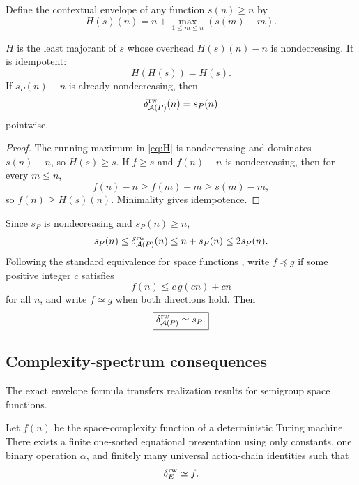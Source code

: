 Define the contextual envelope of any function $s(n)\ge n$ by
\begin{equation}
H(s)(n)=n+\max_{1\le m\le n}(s(m)-m).
\label{eq:H}
\end{equation}

\begin{proposition}\label{prop:H}
$H$ is the least majorant of $s$ whose overhead $H(s)(n)-n$ is nondecreasing.  It is idempotent:
\[
H(H(s))=H(s).
\]
If $s_P(n)-n$ is already nondecreasing, then
\[
\delta^{\mathrm{rw}}_{\mathcal A(P)}(n)=s_P(n)
\]
pointwise.
\end{proposition}

\begin{proof}
The running maximum in \eqref{eq:H} is nondecreasing and dominates $s(n)-n$, so $H(s)\ge s$.  If $f\ge s$ and $f(n)-n$ is nondecreasing, then for every $m\le n$,
\[
f(n)-n\ge f(m)-m\ge s(m)-m,
\]
so $f(n)\ge H(s)(n)$.  Minimality gives idempotence.
\end{proof}

Since $s_P$ is nondecreasing and $s_P(n)\ge n$,
\begin{equation}
s_P(n)\le\delta^{\mathrm{rw}}_{\mathcal A(P)}(n)
\le n+s_P(n)\le2s_P(n).
\label{eq:spacebounds}
\end{equation}
Following the standard equivalence for space functions \cite{Olshanskii2013}, write $f\preceq g$ if some positive integer $c$ satisfies
\[
f(n)\le c\,g(cn)+cn
\]
for all $n$, and write $f\simeq g$ when both directions hold.  Then
\begin{equation}
\boxed{\delta^{\mathrm{rw}}_{\mathcal A(P)}\simeq s_P.}
\label{eq:spaceequivalence}
\end{equation}

\subsection{Complexity-spectrum consequences}

The exact envelope formula transfers realization results for semigroup space functions.

\begin{corollary}\label{cor:realization}
Let $f(n)$ be the space-complexity function of a deterministic Turing machine.  There exists a finite one-sorted equational presentation using only constants, one binary operation $\alpha$, and finitely many universal action-chain identities such that
\[
\delta^{\mathrm{rw}}_E\simeq f.
\]
\end{corollary}

